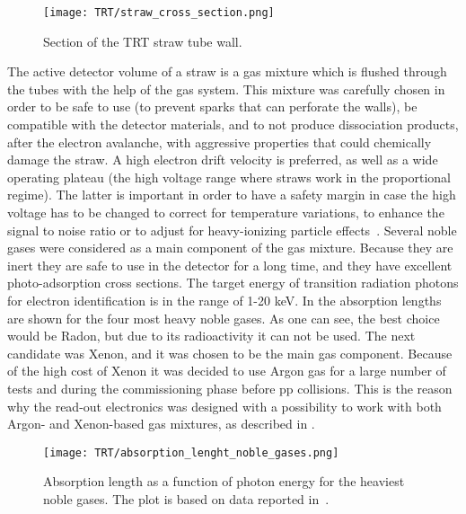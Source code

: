 \begin{figure}
\centering
\texttt{[image: TRT/straw\_cross\_section.png]}
\caption{ 
Section of the TRT straw tube wall.
}
\label{fig:straw_wall_section}
\end{figure}

The active detector volume of a straw is a gas mixture which is flushed through the tubes with the help of the gas system.
This mixture was carefully chosen in order to be safe to use (to prevent sparks that can perforate the walls), be compatible with the detector materials, and to not produce dissociation products, after the electron avalanche, with aggressive properties that could chemically damage the straw.
A high electron drift velocity is preferred, as well as a wide operating plateau (the high voltage range where straws work in the proportional regime). 
The latter is important in order to have a
safety margin in case the high voltage has to be changed to correct for temperature variations, to enhance the signal to noise ratio 
or to adjust for 
heavy-ionizing particle effects~\cite{Abat:2008zza}.
Several noble gases were considered as a main component of the gas mixture. Because they are inert they are safe to use in the detector for a long time, and they have 
excellent photo-adsorption cross sections.
The target energy of transition radiation photons for electron identification is in the range of 1-20 keV.
In  the absorption lengths are shown for the four most heavy noble gases.
As one can see, the best choice would be Radon, but due to its radioactivity it can not be used.
The next candidate was Xenon, and it was chosen to be the main gas component.
Because of the high cost of Xenon it was decided to use Argon gas for a large number of tests and during the commissioning phase before pp collisions. This is the reason why the read-out electronics was
designed with a possibility to work with both Argon- and Xenon-based gas mixtures, as described in .

\begin{figure}
\centering
\texttt{[image: TRT/absorption\_lenght\_noble\_gases.png]}
\caption{ 
  Absorption length as a function of photon energy for the heaviest noble gases. The plot is based on data reported in~\cite{Hubbell:353989}.
}
\label{fig:absorption_lenght}
\end{figure}

